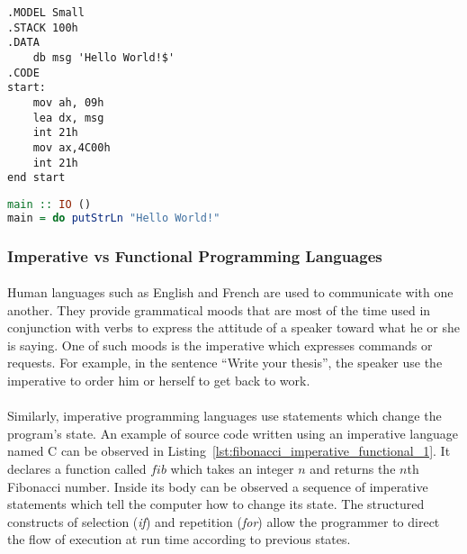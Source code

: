 \noindent\begin{minipage}{.45\textwidth}
	\begin{lstlisting}[caption={Hello World written in MASM}, label={lst:high_low_level_programming_languages_1}, frame=tlrb, language={[x86masm]Assembler}, otherkeywords={.CODE}]
.MODEL Small
.STACK 100h
.DATA
	db msg 'Hello World!$'
.CODE
start:
	mov ah, 09h
	lea dx, msg
	int 21h
	mov ax,4C00h
	int 21h
end start
	\end{lstlisting}
\end{minipage}\hfill
\begin{minipage}{.45\textwidth}
	\begin{lstlisting}[caption={Hello World written in Haskell}, label={lst:high_low_level_programming_languages_2}, frame=tlrb, language={haskell}]
main :: IO ()
main = do putStrLn "Hello World!"
	\end{lstlisting}
\end{minipage}

\subsubsection{Imperative vs Functional Programming Languages}
\paragraph{}
Human languages such as English and French are used to communicate with one another. They provide grammatical moods that are most of the time used in conjunction with verbs to express the attitude of a speaker toward what he or she is saying. One of such moods is the imperative which expresses commands or requests. For example, in the sentence “Write your thesis”, the speaker use the imperative to order him or herself to get back to work.

\paragraph{}
Similarly, imperative programming languages use statements which change the program's state. An example of source code written using an imperative language named C can be observed in Listing~\ref{lst:fibonacci_imperative_functional_1}. It declares a function called $fib$ which takes an integer $n$ and returns the $n$th Fibonacci number. Inside its body can be observed a sequence of imperative statements which tell the computer how to change its state. The structured constructs of selection (\textit{if}) and repetition (\textit{for}) allow the programmer to direct the flow of execution at run time according to previous states.\\ \\

